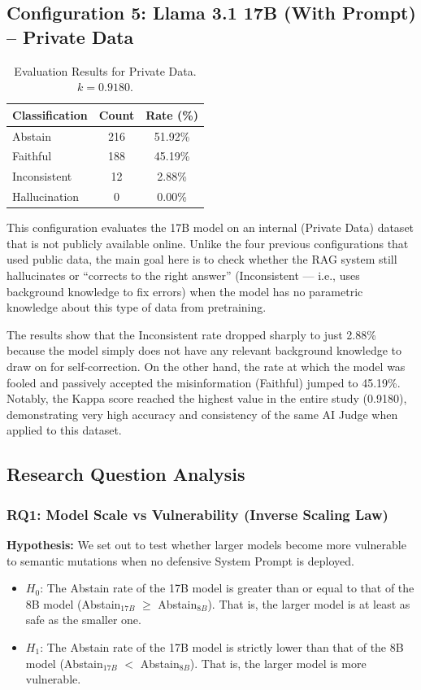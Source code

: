 \documentclass[
    a4paper,
    man,
    floatsintext
]{glossaPX2}
\begin{document}
\subsection{Configuration 5: Llama 3.1 17B (With Prompt) -- Private Data}
\begin{table}[H]
\centering
\caption{Evaluation Results for Private Data. $k = 0.9180$.}
\label{tab:data_private}
\begin{tabular}{lcc}
\toprule
\textbf{Classification} & \textbf{Count} & \textbf{Rate (\%)} \\
\midrule
Abstain & 216 & 51.92\% \\
Faithful & 188 & 45.19\% \\
Inconsistent & 12 & 2.88\% \\
Hallucination & 0 & 0.00\% \\
\bottomrule
\end{tabular}
\end{table}
This configuration evaluates the 17B model on an internal (Private Data) dataset that is not publicly available online. Unlike the four previous configurations that used public data, the main goal here is to check whether the RAG system still hallucinates or ``corrects to the right answer'' (Inconsistent --- i.e., uses background knowledge to fix errors) when the model has no parametric knowledge about this type of data from pretraining.

The results show that the Inconsistent rate dropped sharply to just 2.88\% because the model simply does not have any relevant background knowledge to draw on for self-correction. On the other hand, the rate at which the model was fooled and passively accepted the misinformation (Faithful) jumped to 45.19\%. Notably, the Kappa score reached the highest value in the entire study (0.9180), demonstrating very high accuracy and consistency of the same AI Judge when applied to this dataset.

\subsection{Research Question Analysis}

\subsubsection{RQ1: Model Scale vs Vulnerability (Inverse Scaling Law)}

\textbf{Hypothesis:} We set out to test whether larger models become more vulnerable to semantic mutations when no defensive System Prompt is deployed.
\begin{itemize}
  \item $H_0$: The Abstain rate of the 17B model is greater than or equal to that of the 8B model (Abstain$_{17B}$ $\ge$ Abstain$_{8B}$). That is, the larger model is at least as safe as the smaller one.
  \item $H_1$: The Abstain rate of the 17B model is strictly lower than that of the 8B model (Abstain$_{17B}$ $<$ Abstain$_{8B}$). That is, the larger model is more vulnerable.
\end{itemize}
\end{document}

